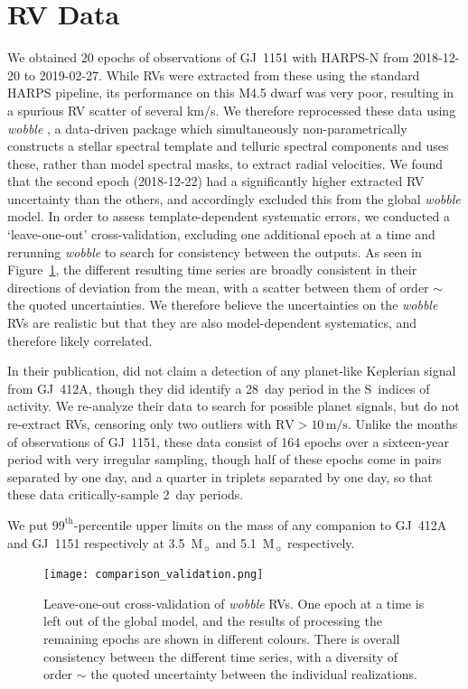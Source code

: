 \documentclass[modern]{aastex62}
\newcommand{\msun}{\mbox{$\mathrm{M}_{\sun}$}\xspace}
\begin{document}
\section{RV Data}
\label{sec:k2}

We obtained 20 epochs of observations of GJ~1151 with HARPS-N from 2018-12-20 to 2019-02-27. While RVs were extracted from these using the standard HARPS pipeline, its performance on this M4.5 dwarf was very poor, resulting in a spurious RV scatter of several km/s. We therefore reprocessed these data using \textit{wobble} \citep{wobble}, a data-driven package which simultaneously non-parametrically constructs a stellar spectral template and telluric spectral components and uses these, rather than model spectral masks, to extract radial velocities. We found that the second epoch (2018-12-22) had a significantly higher extracted RV uncertainty than the others, and accordingly excluded this from the global \textit{wobble} model. In order to assess template-dependent systematic errors, we conducted a `leave-one-out' cross-validation, excluding one additional epoch at a time and rerunning \textit{wobble} to search for consistency between the outputs. As seen in Figure~\ref{xvalidation}, the different resulting time series are broadly consistent in their directions of deviation from the mean, with a scatter between them of order $\sim$ the quoted uncertainties. We therefore believe the uncertainties on the \textit{wobble} RVs are realistic but that they are also model-dependent systematics, and therefore likely correlated. 

In their publication, \citet{hires} did not claim a detection of any planet-like Keplerian signal from GJ~412A, though they did identify a 28~day period in the S~indices of activity. We re-analyze their data to search for possible planet signals, but do not re-extract RVs, censoring only two outliers with $\text{RV}>10\,\text{m/s}$. Unlike the months of observations of GJ~1151, these data consist of 164 epochs over a sixteen-year period with very irregular sampling, though half of these epochs come in pairs separated by one day, and a quarter in triplets separated by one day, so that these data critically-sample 2~day periods.

We put $99^{\text{th}}$-percentile upper limits on the mass of any companion to GJ~412A and GJ~1151 respectively at 3.5~\msun and 5.1~\msun respectively. 

\begin{figure}
\noindent\texttt{[image: comparison\_validation.png]}

\caption{\label{xvalidation}
Leave-one-out cross-validation of \textit{wobble} RVs. One epoch at a time is left out of the global model, and the results of processing the remaining epochs are shown in different colours. There is overall consistency between the different time series, with a diversity of order $\sim$ the quoted uncertainty between the individual realizations. %
}
\end{figure}
\end{document}
